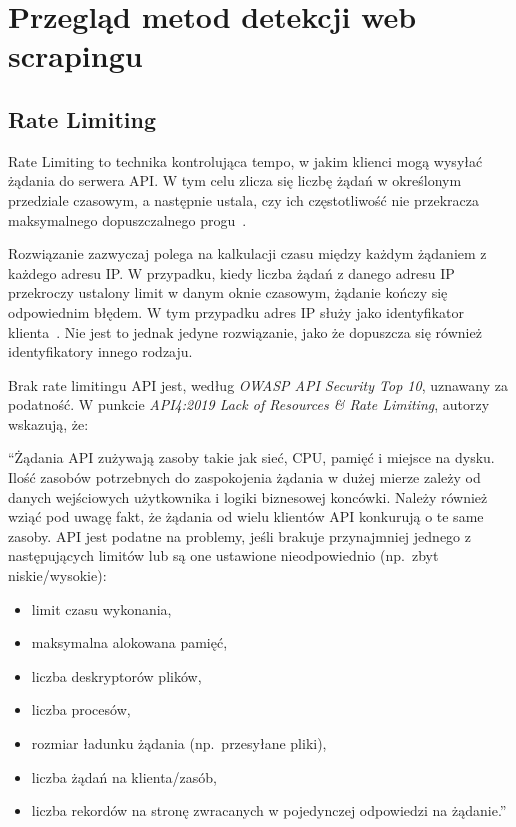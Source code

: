 \newpage


\section{Przegląd metod detekcji web scrapingu}\label{sec:przeglad-rozwiazan}

\subsection{Rate Limiting}\label{subsec:rate-limiting}

Rate Limiting to technika kontrolująca tempo, w jakim klienci mogą wysyłać żądania do serwera API\@.
W tym celu zlicza się liczbę żądań w określonym przedziale czasowym, a następnie ustala, czy ich częstotliwość nie przekracza maksymalnego dopuszczalnego progu~\cite{api-rate-limit-adoption}.

Rozwiązanie zazwyczaj polega na kalkulacji czasu między każdym żądaniem z każdego adresu IP\@.
W przypadku, kiedy liczba żądań z danego adresu IP przekroczy ustalony limit w danym oknie czasowym, żądanie kończy się odpowiednim błędem.
W tym przypadku adres IP służy jako identyfikator klienta~\cite{cloudflare-what-is-rate-limiting}.
Nie jest to jednak jedyne rozwiązanie, jako że dopuszcza się również identyfikatory innego rodzaju.

Brak rate limitingu API jest, według \emph{OWASP API Security Top 10}, uznawany za podatność.
W punkcie \emph{API4:2019 Lack of Resources \& Rate Limiting}, autorzy wskazują, że:\@
\begin{displayquote}
    ``Żądania API zużywają zasoby takie jak sieć, CPU, pamięć i miejsce na dysku.
    Ilość zasobów potrzebnych do zaspokojenia żądania w dużej mierze zależy od danych wejściowych użytkownika i logiki biznesowej koncówki.
    Należy również wziąć pod uwagę fakt, że żądania od wielu klientów API konkurują o te same zasoby.
    API jest podatne na problemy, jeśli brakuje przynajmniej jednego z następujących limitów lub są one ustawione nieodpowiednio (np.\ zbyt niskie/wysokie):
    \begin{itemize}
        \item limit czasu wykonania,
        \item maksymalna alokowana pamięć,
        \item liczba deskryptorów plików,
        \item liczba procesów,
        \item rozmiar ładunku żądania (np.\ przesyłane pliki),
        \item liczba żądań na klienta/zasób,
        \item liczba rekordów na stronę zwracanych w pojedynczej odpowiedzi na żądanie.''
    \end{itemize}
\end{displayquote}

